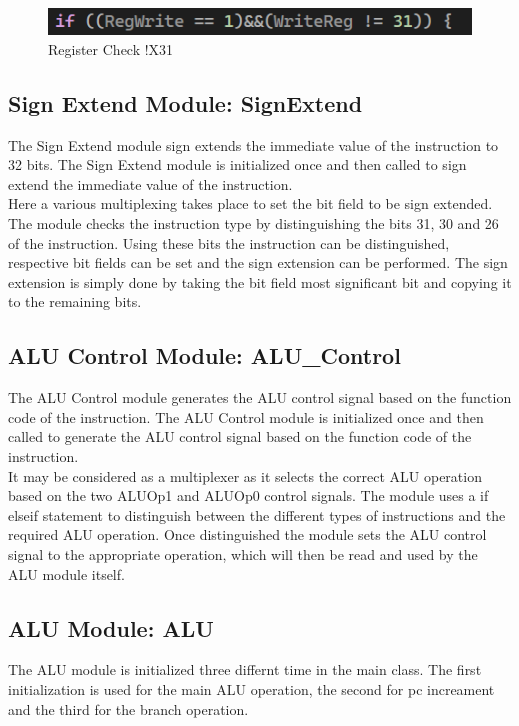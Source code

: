 \documentclass{article}
\begin{document}
\begin{figure}[htbp]
    \centering
    \includegraphics[width=1\textwidth]{screen_dumps/register_not_X31.png}
    \caption{Register Check !X31}
    \label{fig:4}
\end{figure}

\subsection{Sign Extend Module: SignExtend}
The Sign Extend module sign extends the immediate value of the instruction to 32 bits. The Sign Extend module is initialized once and then called to sign extend the immediate value of the instruction.\\

Here a various multiplexing takes place to set the bit field to be sign extended. The module checks the instruction type by distinguishing the bits 31, 30 and 26 of the instruction. Using these bits the instruction can be distinguished, respective bit fields can be set and the sign extension can be performed. The sign extension is simply done by taking the bit field most significant bit and copying it to the remaining bits.\\ 

\subsection{ALU Control Module: ALU\_Control}
The ALU Control module generates the ALU control signal based on the function code of the instruction. The ALU Control module is initialized once and then called to generate the ALU control signal based on the function code of the instruction.\\

It may be considered as a multiplexer as it selects the correct ALU operation based on the two ALUOp1 and ALUOp0 control signals. The module uses a if elseif statement to distinguish between the different types of instructions and the required ALU operation. Once distinguished the module sets the ALU control signal to the appropriate operation, which will then be read and used by the ALU module itself.\\

\subsection{ALU Module: ALU}
The ALU module is initialized three differnt time in the main class. The first initialization is used for the main ALU operation, the second for pc increament and the third for the branch operation.\\
\end{document}
